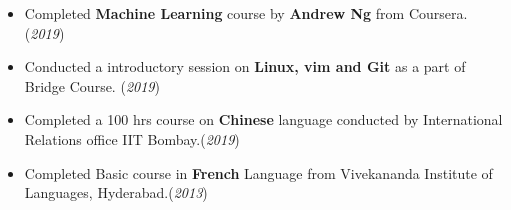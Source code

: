 \documentclass[10pt]{article}
\begin{document}
\colorbox{bl}{}
\vspace{-0.58cm}
\begin{itemize}[leftmargin=0.4cm]
    \item { Completed \textbf{Machine Learning} course by \textbf{Andrew Ng} from Coursera. }\hfill{(\textit{2019})}\vspace{-0.2cm}
    	\item {Conducted a introductory session on \textbf{Linux, vim and Git} as a part of Bridge Course. }\hfill{(\textit{2019})}\vspace{-0.2cm}
    \item {Completed a 100 hrs course on \textbf{Chinese} language conducted by International Relations office IIT Bombay.}\hfill{(\textit{2019})}\vspace{-0.2cm}
    \item {Completed Basic course in \textbf{French} Language from Vivekananda Institute of Languages, Hyderabad.}\hfill{(\textit{2013})}\vspace{-0.2cm}
\end{itemize}

\end{document}
